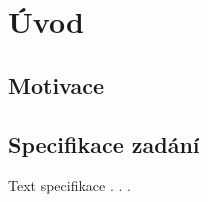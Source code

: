 \section{Úvod}



\subsection{Motivace}
\label{sec:background}

\subsection{Specifikace zadání}
Text specifikace . . .

